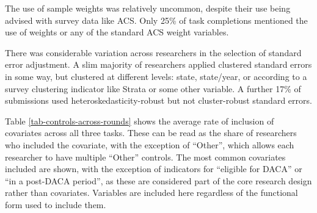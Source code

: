 \documentclass[
  letterpaper,
  DIV=11,
  numbers=noendperiod]{scrartcl}
\begin{document}
The use of sample weights was relatively uncommon, despite their use
being advised with survey data like ACS. Only 25\% of task completions
mentioned the use of weights or any of the standard ACS weight
variables.

There was considerable variation across researchers in the selection of
standard error adjustment. A slim majority of researchers applied
clustered standard errors in some way, but clustered at different
levels: state, state/year, or according to a survey clustering indicator
like Strata or some other variable. A further 17\% of submissions used
heteroskedasticity-robust but not cluster-robust standard errors.

\begin{table}[!htbp] \centering \renewcommand*{\arraystretch}{1.1}\caption{Estimation Methods}\label{tab-estimation-methods}
\end{table}

Table \ref{tab-controls-across-rounds} shows the average rate of
inclusion of covariates across all three tasks. These can be read as the
share of researchers who included the covariate, with the exception of
``Other'', which allows each researcher to have multiple ``Other''
controls. The most common covariates included are shown, with the
exception of indicators for ``eligible for DACA'' or ``in a post-DACA
period'', as these are considered part of the core research design
rather than covariates. Variables are included here regardless of the
functional form used to include them.
\end{document}
